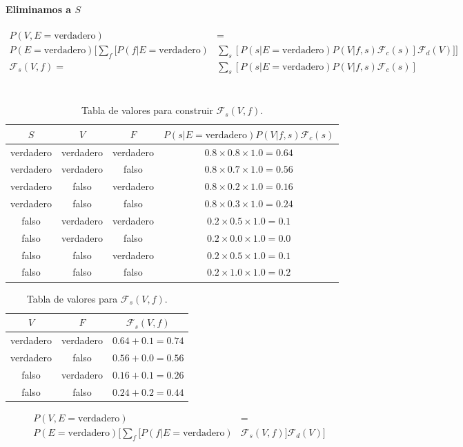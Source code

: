 \documentclass[12pt]{article}
\begin{document}
\paragraph{Eliminamos a $S$}
\begin{equation}
\begin{split}
P(V,E=\text{verdadero})&=\\
P(E=\text{verdadero})[\sum_{f}[P(f|E=\text{verdadero})&\sum_{s}[P(s|E=\text{verdadero})P(V|f,s)\mathcal{F}_c(s)]\mathcal{F}_d(V)]]\\
\mathcal{F}_s(V,f)=& \sum_{s}[P(s|E=\text{verdadero})P(V|f,s)\mathcal{F}_c(s)]\\
\end{split}
\end{equation}\\
\begin{table}[h!]
	\centering
	\begin{tabular}{|c|c|c|c|}
		\hline
		\rowcolor[gray]{.8}
		$S$&$V$&$F$&$P(s|E=\text{verdadero})P(V|f,s)\mathcal{F}_c(s)$ \\\hline %
		verdadero&verdadero&verdadero & $0.8\times0.8\times1.0=0.64$\\\hline
		verdadero&verdadero&falso & $0.8\times0.7\times1.0=0.56$\\\hline
		verdadero&falso&verdadero & $0.8\times0.2\times1.0=0.16$\\\hline
		verdadero&falso&falso & $0.8\times0.3\times1.0=0.24$\\\hline
		falso&verdadero&verdadero & $0.2\times0.5\times1.0=0.1$\\\hline
		falso&verdadero&falso & $0.2\times0.0\times1.0=0.0$\\\hline
		falso&falso&verdadero & $0.2\times0.5\times1.0=0.1$\\\hline
		falso&falso&falso & $0.2\times1.0\times1.0=0.2$\\\hline
	\end{tabular}
	\caption{Tabla de valores para construir $\mathcal{F}_s(V,f)$.}
	\label{tab:ej3009}
\end{table}
\begin{table}[h!]
	\centering
	\begin{tabular}{|c|c|c|}
		\hline
		\rowcolor[gray]{.8}
		$V$&$F$&$\mathcal{F}_s(V,f)$ \\\hline %
		verdadero&verdadero & $0.64 + 0.1 = 0.74$\\\hline
		verdadero&falso & $0.56 + 0.0 = 0.56$\\\hline
		falso&verdadero & $0.16 + 0.1 = 0.26$\\\hline
		falso&falso & $0.24 + 0.2 = 0.44$\\\hline
	\end{tabular}
	\caption{Tabla de valores para $\mathcal{F}_s(V,f)$.}
	\label{tab:ej3010}
\end{table}
\begin{equation}
\begin{split}
P(V,E=\text{verdadero})&=\\
P(E=\text{verdadero})[\sum_{f}[P(f|E=\text{verdadero})&\mathcal{F}_s(V,f)]\mathcal{F}_d(V)]\\
\end{split}
\end{equation}\\
\end{document}
